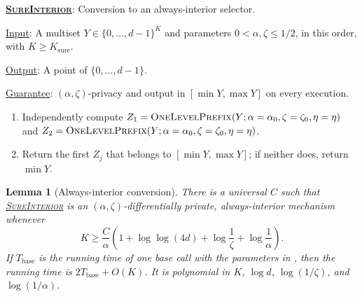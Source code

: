 \documentclass[11pt]{article}
\newenvironment{fminipage}%
  {\begin{Sbox}\begin{minipage}}%
  {\end{minipage}\end{Sbox}\fbox{\TheSbox}}
\newenvironment{algbox}[0]{%
\vskip 0.2in
\noindent
\begin{fminipage}{6.3in}
}{%
\end{fminipage}
\vskip 0.2in
}
\newtheorem{lemma}{Lemma}[section]
\begin{document}
\begin{algbox}
\textbf{\uline{\textsc{SureInterior}}}: Conversion to an always-interior
selector.  \label{alg:sure-interior}

\uline{Input}: A multiset $Y\in\{0,\ldots,d-1\}^K$ and parameters
$0<\alpha,\zeta\le1/2$, in this order, with $K\ge K_{\mathrm{sure}}$.

\uline{Output}: A point of $\{0,\ldots,d-1\}$.

\uline{Guarantee}: $(\alpha,\zeta)$-privacy and output in
$[\min Y,\max Y]$ on every execution.

\begin{enumerate}[leftmargin=*,nosep]
  \item Independently compute
  $Z_1=\text{\textsc{OneLevelPrefix}}
  (Y;\alpha=\alpha_0,\zeta=\zeta_0,\eta=\eta)$ and
  $Z_2=\text{\textsc{OneLevelPrefix}}
  (Y;\alpha=\alpha_0,\zeta=\zeta_0,\eta=\eta)$.
  \item Return the first $Z_j$ that belongs to $[\min Y,\max Y]$; if neither
  does, return $\min Y$.
\end{enumerate}
\end{algbox}

\begin{lemma}[Always-interior conversion]
\label{lem:sure-interior}
There is a universal $C$ such that
\hyperref[alg:sure-interior]{\textsc{SureInterior}} is an
$(\alpha,\zeta)$-differentially private, always-interior mechanism whenever
\begin{equation}
 K\ge\frac{C}{\alpha}\left(
  1+\log\log(4d)+\log\frac1\zeta+\log\frac1\alpha
 \right).
 \label{eq:sure-sample}
\end{equation}
If $T_{\mathrm{base}}$ is the running time of one base call with the
parameters in , then the running time is
$2T_{\mathrm{base}}+O(K)$.  It is polynomial in $K$, $\log d$,
$\log(1/\zeta)$, and $\log(1/\alpha)$.
\end{lemma}
\end{document}
